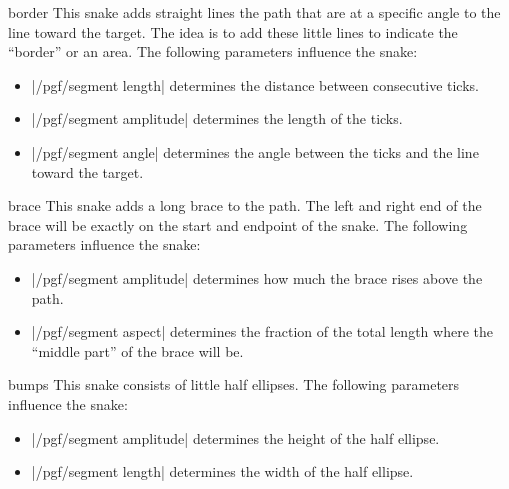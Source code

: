 \begin{snake}{border}
  This snake adds straight lines the path that are at a specific angle
  to the line toward the target. The idea is to add these little lines
  to indicate the ``border'' or an area. The following parameters
  influence the snake:  
  \begin{itemize}
  \item |/pgf/segment length|
    determines the distance between consecutive ticks.
  \item |/pgf/segment amplitude|
    determines the length of the ticks.
  \item |/pgf/segment angle|
    determines the angle between the ticks and the line toward the
    target. 
  \end{itemize}
\begin{codeexample}[]
\end{codeexample}
\end{snake}


\begin{snake}{brace}
  This snake adds a long brace to the path. The left and right end of
  the brace will be exactly on the start and endpoint of the
  snake. The following parameters influence the snake:  
  \begin{itemize}
  \item |/pgf/segment amplitude|
    determines how much the brace rises above the path.
  \item |/pgf/segment aspect|
    determines the fraction of the total length where the ``middle
    part'' of the brace will be.  
  \end{itemize}
\begin{codeexample}[]
\end{codeexample}
\end{snake}

\begin{snake}{bumps}
  This snake consists of little half ellipses. The following parameters
  influence the snake:
  \begin{itemize}
  \item |/pgf/segment amplitude|
    determines the height of the half ellipse.
  \item |/pgf/segment length|
    determines the width of the half ellipse.
  \end{itemize}
\begin{codeexample}[]
\end{codeexample}
\end{snake}



